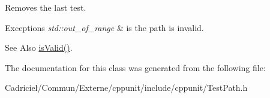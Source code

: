 Removes the last test. 
\begin{DoxyExceptions}{Exceptions}
{\em std\-::out\-\_\-of\-\_\-range} & is the path is invalid. \\
\hline
\end{DoxyExceptions}


\begin{DoxySeeAlso}{See Also}
\hyperlink{class_test_path_aca6ad4784df09af24573890d2d145435}{is\-Valid()}. 
\end{DoxySeeAlso}


The documentation for this class was generated from the following file\-:\begin{DoxyCompactItemize}
\item 
Cadriciel/\-Commun/\-Externe/cppunit/include/cppunit/Test\-Path.\-h\end{DoxyCompactItemize}
